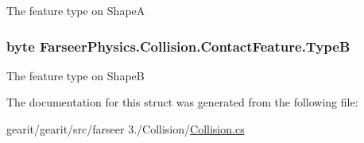 The feature type on Shape\+A 

\hypertarget{struct_farseer_physics_1_1_collision_1_1_contact_feature_a8709a56713996072bdddb2d3a8ee5dcf}{
\subsubsection[{Type\+B}]{\setlength{\rightskip}{0pt plus 5cm}byte Farseer\+Physics.\+Collision.\+Contact\+Feature.\+Type\+B}}\label{struct_farseer_physics_1_1_collision_1_1_contact_feature_a8709a56713996072bdddb2d3a8ee5dcf}


The feature type on Shape\+B 



The documentation for this struct was generated from the following file\+:\begin{DoxyCompactItemize}
\item 
gearit/gearit/src/farseer 3./\+Collision/\hyperlink{_collision_8cs}{Collision.\+cs}\end{DoxyCompactItemize}
